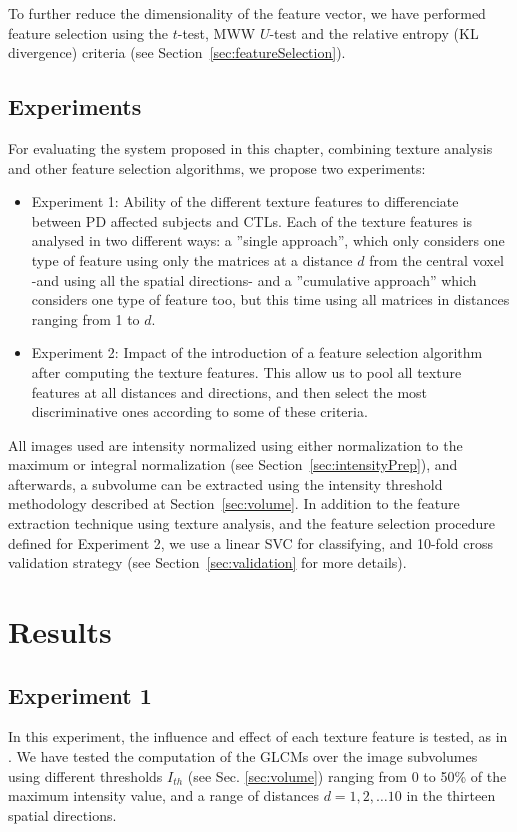 To further reduce the dimensionality of the feature vector, we have performed feature selection using the $t$-test, \ac{MWW} $U$-test and the relative entropy (\ac{KL} divergence) criteria (see Section~\ref{sec:featureSelection}). 

\subsection{Experiments}
For evaluating the system proposed in this chapter, combining texture analysis and other feature selection algorithms, we propose two experiments: 
\begin{itemize}
	\item Experiment 1: Ability of the different texture features to differenciate between \ac{PD} affected subjects and \acp{CTL}. Each of the texture features is analysed in two different ways: a ''single approach'', which only considers one type of feature using only the matrices at a distance $d$ from the central voxel -and using all the spatial directions- and a ''cumulative approach'' which considers one type of feature too, but this time using all matrices in distances ranging from 1 to $d$. 
	\item Experiment 2: Impact of the introduction of a feature selection algorithm after computing the texture features. This allow us to pool all texture features at all distances and directions, and then select the most discriminative ones according to some of these criteria.  
\end{itemize}

All images used are intensity normalized using either normalization to the maximum or integral normalization (see Section~\ref{sec:intensityPrep}), and afterwards, a subvolume can be extracted using the intensity threshold methodology described at Section~\ref{sec:volume}. In addition to the feature extraction technique using texture analysis, and the feature selection procedure defined for Experiment 2, we use a linear \ac{SVC} for classifying, and 10-fold cross validation strategy (see Section~\ref{sec:validation} for more details). 

\section{Results}\label{sec:ch5results}
\subsection{Experiment 1}
In this experiment, the influence and effect of each texture feature is tested, as in \cite{Martinez-Murcia2013266}. We have tested the computation of the \acp{GLCM} over the image subvolumes using different thresholds $I_{th}$ (see Sec. \ref{sec:volume}) ranging from 0 to 50\% of the maximum intensity value, and a range of distances $d=1,2,\dots10$ in the thirteen spatial directions.

